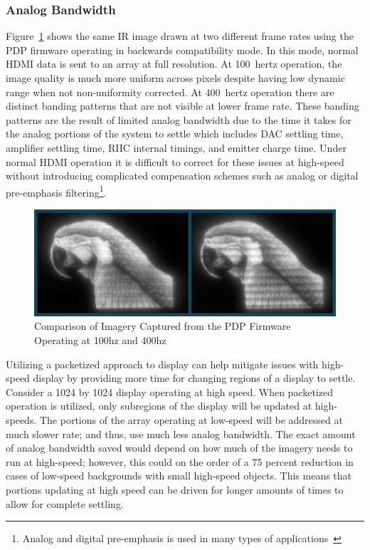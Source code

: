         \subsubsection{Analog Bandwidth}
            \label{sec:analog_bandwidth}
            Figure~\ref{fig:pdp_bird_comparison} shows the same IR image drawn at two different frame rates using the PDP firmware operating in backwards compatibility mode. In this mode, normal HDMI data is sent to an array at full resolution. At \mbox{100 hertz} operation, the image quality is much more uniform across pixels despite having low dynamic range when not non-uniformity corrected. At \mbox{400 hertz} operation there are distinct banding patterns that are not visible at lower frame rate. These banding patterns are the result of limited analog bandwidth due to the time it takes for the analog portions of the system to settle which includes DAC settling time, amplifier settling time, RIIC internal timings, and emitter charge time. Under normal HDMI operation it is difficult to correct for these issues at high-speed without introducing complicated compensation schemes such as analog or digital pre-emphasis filtering\footnote{Analog and digital pre-emphasis is used in many types of applications~\cite{BuckwalterEtAl2006, RafiqueEtAl2015, HuEtAl2017, ThaiEtAl2018, ZhouEtAl2020}}.

            \begin{figure}[t]
                \centering
                \includegraphics[width=1.0\textwidth]{fig/pdp_bird_comparison.png}
                \caption{Comparison of Imagery Captured from the PDP Firmware Operating at 100hz and 400hz}
                \label{fig:pdp_bird_comparison}
            \end{figure}

            Utilizing a packetized approach to display can help mitigate issues with high-speed display by providing more time for changing regions of a display to settle. Consider a 1024 by 1024 display operating at high speed. When packetized operation is utilized, only subregions of the display will be updated at high-speeds. The portions of the array operating at low-speed will be addressed at much slower rate; and thus, use much less analog bandwidth. The exact amount of analog bandwidth saved would depend on how much of the imagery needs to run at high-speed; however, this could on the order of a 75 percent reduction in cases of low-speed backgrounds with small high-speed objects. This means that portions updating at high speed can be driven for longer amounts of times to allow for complete settling.

